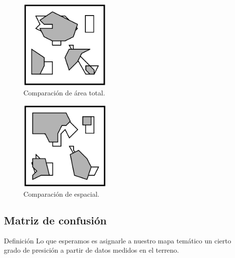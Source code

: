 \documentclass[]{beamer}
\begin{document}
\begin{frame}{\subsecname}
  \begin{figure}
  \includegraphics[width=0.4\textwidth]{imagenes/area-v.png}
  \caption{Comparación de área total.}
  \end{figure}
\end{frame}

\begin{frame}{\subsecname}
  \begin{figure}
  \includegraphics[width=0.4\textwidth]{imagenes/area-e.png}
  \caption{Comparación de espacial.}
  \end{figure}
\end{frame}

\subsection{Matriz de confusión}
\begin{frame}{\subsecname}
\begin{block}{Definición}
  Lo que esperamos es asignarle a nuestro mapa temático un cierto grado de presición a partir de datos medidos en el terreno.
\end{block}
\end{frame}
\end{document}
